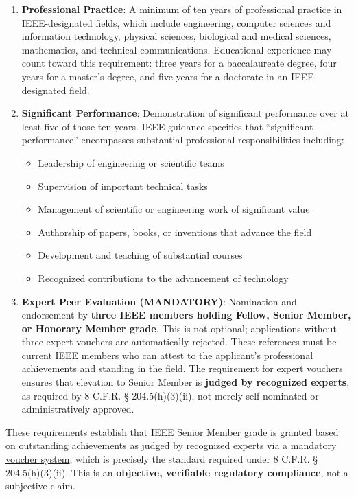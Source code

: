 \begin{enumerate}
    \item \textbf{Professional Practice}: A minimum of ten years of professional practice in IEEE-designated fields, which include engineering, computer sciences and information technology, physical sciences, biological and medical sciences, mathematics, and technical communications. Educational experience may count toward this requirement: three years for a baccalaureate degree, four years for a master's degree, and five years for a doctorate in an IEEE-designated field.
    
    \item \textbf{Significant Performance}: Demonstration of significant performance over at least five of those ten years. IEEE guidance specifies that ``significant performance'' encompasses substantial professional responsibilities including:
    \begin{itemize}
        \item Leadership of engineering or scientific teams
        \item Supervision of important technical tasks
        \item Management of scientific or engineering work of significant value
        \item Authorship of papers, books, or inventions that advance the field
        \item Development and teaching of substantial courses
        \item Recognized contributions to the advancement of technology
    \end{itemize}
    
    \item \textbf{Expert Peer Evaluation (MANDATORY)}: Nomination and endorsement by \textbf{three IEEE members holding Fellow, Senior Member, or Honorary Member grade}. This is not optional; applications without three expert vouchers are automatically rejected. These references must be current IEEE members who can attest to the applicant's professional achievements and standing in the field. The requirement for expert vouchers ensures that elevation to Senior Member is \textbf{judged by recognized experts}, as required by 8 C.F.R. § 204.5(h)(3)(ii), not merely self-nominated or administratively approved.
\end{enumerate}

These requirements establish that IEEE Senior Member grade is granted based on \underline{outstanding achievements} as \underline{judged by recognized experts via a mandatory voucher system}, which is precisely the standard required under 8 C.F.R. § 204.5(h)(3)(ii). This is an \textbf{objective, verifiable regulatory compliance}, not a subjective claim.

